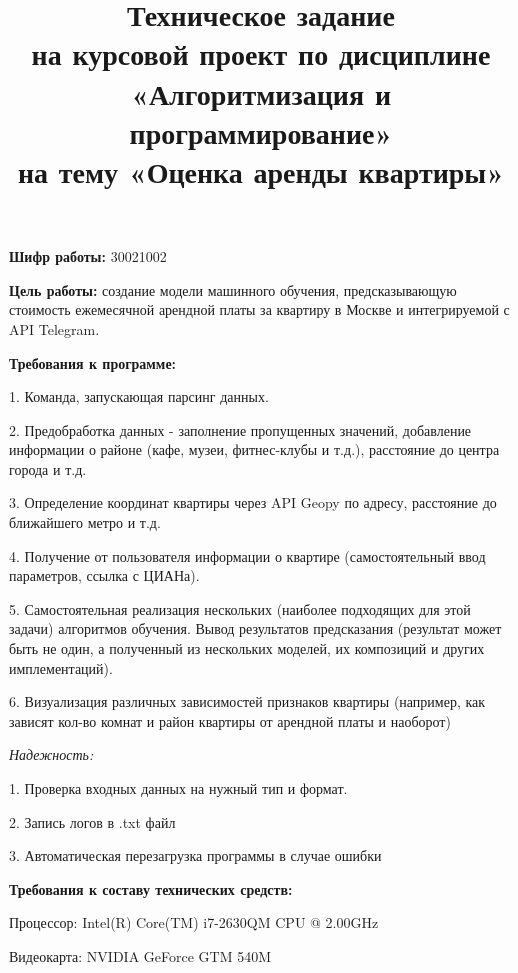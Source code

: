 \documentclass[a4paper,12pt]{article}
\title{Техническое задание \\ на курсовой проект по дисциплине \\ 
«Алгоритмизация и программирование» \\ на тему «Оценка аренды квартиры»}
\date{}
\begin{document}
	
	\maketitle
	\thispagestyle{empty}
	
	\textbf{Шифр работы:} 30021002
	
	\vspace{5ex}
	\textbf{Цель работы:} создание модели машинного обучения, предсказывающую стоимость ежемесячной арендной платы за квартиру в Москве и интегрируемой с API Telegram.
	
	\vspace{5ex}
	\textbf{Требования к программе:}
	
	1. Команда, запускающая парсинг данных.
	
	2. Предобработка данных - заполнение пропущенных значений, добавление информации о районе (кафе, музеи, фитнес-клубы и т.д.), расстояние до центра города и т.д. 
	
	3. Определение координат квартиры  через API Geopy по адресу, расстояние до ближайшего метро и т.д.
	
	4. Получение от пользователя информации о квартире (самостоятельный ввод параметров, ссылка с ЦИАНа).
	
	5. Самостоятельная реализация нескольких (наиболее подходящих для этой задачи) алгоритмов обучения. Вывод результатов предсказания (результат может быть не один, а полученный из нескольких моделей, их композиций и других имплементаций).
	
	\newpage
	\thispagestyle{empty}
	
	6. Визуализация различных зависимостей признаков квартиры (например, как зависят кол-во комнат и район квартиры от арендной платы и наоборот)
	
	
	\vspace{2ex}
	\textit{Надежность:}
	
	1. Проверка входных данных на нужный тип и формат.
	
	2. Запись логов в .txt файл
	
	3. Автоматическая перезагрузка программы в случае ошибки
	
	\vspace{5ex}
	\textbf{Требования к составу технических средств:}
	
	\vspace{1ex}
	
	Процессор: Intel(R) Core(TM) i7-2630QM CPU @ 2.00GHz 
	
	Видеокарта: NVIDIA GeForce GTM 540M
	
\end{document}
